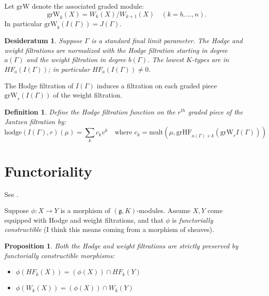 \documentclass[12pt,leqno]{article}
\newtheorem{definition}[equation]{Definition}
\newtheorem{desideratum}[equation]{Desideratum}
\newtheorem{proposition}[equation]{Proposition}
\newcommand{\hodge}{\text{hodge}}
\newcommand{\hf}{HF}
\newcommand{\grhf}{\text{grHF}}
\newcommand{\w}{\text{grW}}
\newcommand{\mult}{\text{mult}}
\renewcommand{\sec}[1]{\section{#1}
\renewcommand{\theequation}{\thesection.\arabic{equation}}
  \setcounter{equation}{0}}
\newcommand{\g}{\mathfrak g}
\renewcommand{\sec}[1]{\section{#1}
\renewcommand{\theequation}{\thesection.\arabic{equation}}
  \setcounter{equation}{0}}
\begin{document}
Let $\w$ denote the associated graded module:
\begin{equation}
\label{e:j}
\w_k(X)=W_k(X)/W_{k+1}(X) \quad(k=b,\dots, n).
\end{equation}
In particular $\w_b(I(\Gamma))=J(\Gamma)$.

\begin{desideratum}
Suppose $\Gamma$ is a standard final limit parameter.
The Hodge and weight filtrations are normalized with the Hodge filtration starting in degree  $a(\Gamma)$ and the weight filtration in degree $b(\Gamma)$.
The lowest $K$-types are in $\hf_a(I(\Gamma))$;  in particular $\hf_a(I(\Gamma))\ne 0$.
\end{desideratum}

The Hodge filtration of $I(\Gamma)$ induces a filtration on each
graded piece $\w_r(I(\Gamma))$ of the weight filtration.

\begin{definition}
\label{d:hodgeIGammar}
Define the Hodge filtration function on the $r^{th}$ graded piece of the Jantzen filtration by:
{\normalfont
$$
\hodge(I(\Gamma),r)(\mu)=\sum_k c_kv^k\quad\text{where }c_k=\mult(\mu,\grhf_{a(\Gamma)+k}(\w_rI(\Gamma)))
$$
}
\end{definition}



\sec{Functoriality}
\label{s:functoriality}

See \cite{schmid_vilonen_hodge_theory}.

Suppose $\phi\colon X\rightarrow Y$ is a morphism of $(\g,K)$-modules.
Assume $X,Y$ come equipped with Hodge and weight filtrations, and that
$\phi$ is {\it functorially constructible} (I think this means coming from a morphism of sheaves).

\begin{proposition}
Both the Hodge and weight filtrations are {\it strictly preserved by functorially constructible morphisms:}
\begin{itemize}
\item[(a)] $\phi(\hf_k(X))=(\phi(X))\cap \hf_k(Y)$
\item[(b)] $\phi(W_k(X))=(\phi(X))\cap W_k(Y)$
\end{itemize}
\end{proposition}
\end{document}
